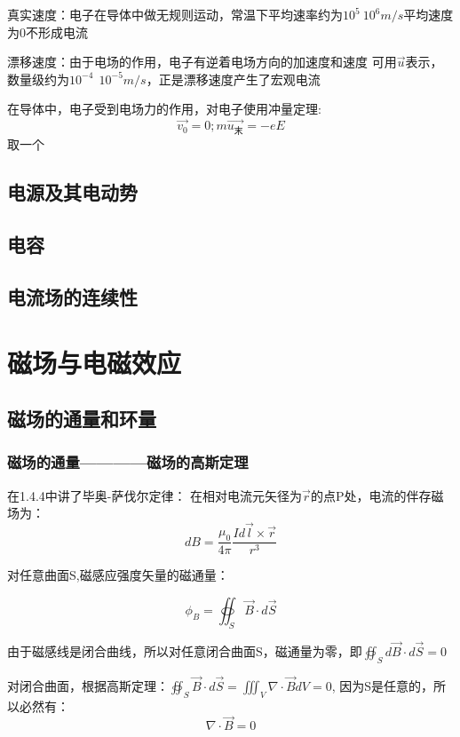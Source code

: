\documentclass[11pt]{ctexart}
\begin{document}
真实速度：电子在导体中做无规则运动，常温下平均速率约为$10^5~10^6m/s$平均速度为0不形成电流

漂移速度：由于电场的作用，电子有逆着电场方向的加速度和速度 可用$\vec{u}$表示，数量级约为$10^{-4}~~10^{-5}m/s$，正是漂移速度产生了宏观电流

在导体中，电子受到电场力的作用，对电子使用冲量定理:
\begin{equation}
    \vec{v_0}=0;
    m\vec{u_末}=-eE
\end{equation}
取一个
\subsection{电源及其电动势}
\subsection{电容}
\subsection{电流场的连续性}



\newpage

\section{磁场与电磁效应}
\subsection{磁场的通量和环量}
\subsubsection{磁场的通量————磁场的高斯定理}
在1.4.4中讲了毕奥-萨伐尔定律：
在相对电流元矢径为$\vec{r}$的点P处，电流的伴存磁场为：
\begin{equation}
    dB=\frac{\mu_0}{4 \pi} \frac{I d\vec{l} \times \vec{r}}{r^3}
\end{equation}

对任意曲面S,磁感应强度矢量的磁通量：

\begin{equation}
    \phi_B=\oiint_S \vec{B} \cdot d\vec{S}
\end{equation}

由于磁感线是闭合曲线，所以对任意闭合曲面S，磁通量为零，即$\oiint_S d\vec{B} \cdot d\vec{S} =0$

对闭合曲面，根据高斯定理：$ \oiint _S \vec{B} \cdot d\vec{S}=\iiint_V \nabla \cdot \vec{B} dV =0 $,
因为S是任意的，所以必然有：
\begin{equation}
    \nabla \cdot \vec{B} =0
\end{equation}
\end{document}
